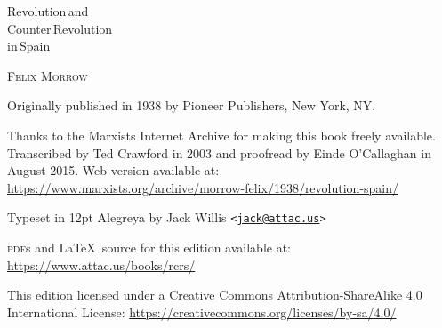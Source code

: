 \begin{titlepage}
	\setlength{\parindent}{0pt}
	\centering
	
	\vspace*{\fill}
	
	{\AlegreyaSansBlack\fontsize{42}{42}\selectfont
		Revolution\,\textmd{and} \\
		Counter\,Revolution \\
		\textmd{in}\,Spain
		\par}
	
	\vspace{63pt}
	
	{\AlegreyaSans\fontsize{21}{21}\selectfont
		\textsc{Felix Morrow}
		\par}
	
	\vspace*{\fill}
	
\end{titlepage}

{
	\setlength{\parindent}{0em}
	\setlength{\parskip}{0.5em}
	\sloppy
	
	\vspace*{\fill}
	
	Originally published in 1938 by Pioneer Publishers, New York, NY.
	
	Thanks to the Marxists Internet Archive
	for making this book freely available.
	Transcribed by Ted Crawford in 2003
	and proofread by Einde O’Callaghan in August 2015.
	Web version available at:
	\url{https://www.marxists.org/archive/morrow-felix/1938/revolution-spain/}
	
	Typeset in 12pt Alegreya by Jack Willis
	\texttt{<\href{mailto:jack@attac.us}{jack@attac.us}>}
	
	\textsc{pdf}s and \LaTeX\ source for this edition available at: \url{https://www.attac.us/books/rcrs/}
	
	This edition licensed under a Creative Commons Attribution-Share\-Alike 4.0 International License:
	\url{https://creativecommons.org/licenses/by-sa/4.0/}
}